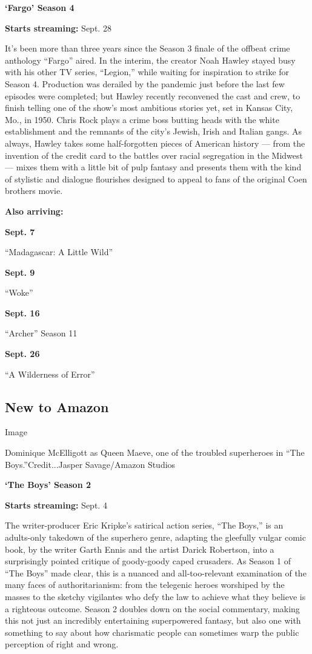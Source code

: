 \textbf{`Fargo' Season 4}

\textbf{Starts streaming:} Sept. 28

It's been more than three years since the Season 3 finale of the offbeat
crime anthology ``Fargo'' aired. In the interim, the creator Noah Hawley
stayed busy with his other TV series, ``Legion,'' while waiting for
inspiration to strike for Season 4. Production was derailed by the
pandemic just before the last few episodes were completed; but Hawley
recently reconvened the cast and crew, to finish telling one of the
show's most ambitious stories yet, set in Kansas City, Mo., in 1950.
Chris Rock plays a crime boss butting heads with the white establishment
and the remnants of the city's Jewish, Irish and Italian gangs. As
always, Hawley takes some half-forgotten pieces of American history ---
from the invention of the credit card to the battles over racial
segregation in the Midwest --- mixes them with a little bit of pulp
fantasy and presents them with the kind of stylistic and dialogue
flourishes designed to appeal to fans of the original Coen brothers
movie.

\textbf{Also arriving:}

\textbf{Sept. 7}

``Madagascar: A Little Wild''

\textbf{Sept. 9}

``Woke''

\textbf{Sept. 16}

``Archer'' Season 11

\textbf{Sept. 26}

``A Wilderness of Error''

\hypertarget{new-to-amazon}{%
\subsection{New to Amazon}\label{new-to-amazon}}

Image

Dominique McElligott as Queen Maeve, one of the troubled superheroes in
``The Boys.''Credit...Jasper Savage/Amazon Studios

\textbf{`The Boys' Season 2}

\textbf{Starts streaming:} Sept. 4

The writer-producer Eric Kripke's satirical action series, ``The Boys,''
is an adults-only takedown of the superhero genre, adapting the
gleefully vulgar comic book, by the writer Garth Ennis and the artist
Darick Robertson, into a surprisingly pointed critique of goody-goody
caped crusaders. As Season 1 of ``The Boys'' made clear, this is a
nuanced and all-too-relevant examination of the many faces of
authoritarianism: from the telegenic heroes worshiped by the masses to
the sketchy vigilantes who defy the law to achieve what they believe is
a righteous outcome. Season 2 doubles down on the social commentary,
making this not just an incredibly entertaining superpowered fantasy,
but also one with something to say about how charismatic people can
sometimes warp the public perception of right and wrong.

